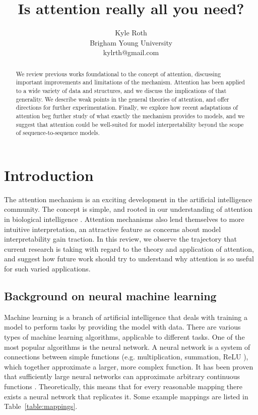 \documentclass{article}
\title{Is attention really all you need?}
\author{
Kyle Roth\\
\affiliations
Brigham Young University\\
\emails
kylrth@gmail.com
}
\begin{document}
\maketitle

\tableofcontents

\vspace{30px}

\begin{abstract}
We review previous works foundational to the concept of attention, discussing important improvements and limitations of the mechanism. Attention has been applied to a wide variety of data and structures, and we discuss the implications of that generality. We describe weak points in the general theories of attention, and offer directions for further experimentation. Finally, we explore how recent adaptations of attention beg further study of what exactly the mechanism provides to models, and we suggest that attention could be well-suited for model interpretability beyond the scope of sequence-to-sequence models.
\end{abstract}

\section{Introduction}

The attention mechanism is an exciting development in the artificial intelligence community. The concept is simple, and rooted in our understanding of attention in biological intelligence \cite{glimpses,neuroscience-inspired}. Attention mechanisms also lend themselves to more intuitive interpretation, an attractive feature as concerns about model interpretability gain traction. In this review, we observe the trajectory that current research is taking with regard to the theory and application of attention, and suggest how future work should try to understand why attention is so useful for such varied applications.

\subsection{Background on neural machine learning}\label{section:background}

Machine learning is a branch of artificial intelligence that deals with training a model to perform tasks by providing the model with data. There are various types of machine learning algorithms, applicable to different tasks. One of the most popular algorithms is the neural network. A neural network is a system of connections between simple functions (e.g. multiplication, summation, ReLU \cite{relu}), which together approximate a larger, more complex function. It has been proven that sufficiently large neural networks can approximate arbitrary continuous functions \cite{universal_approximators}. Theoretically, this means that for every reasonable mapping there exists a neural network that replicates it. Some example mappings are listed in Table~\ref{table:mappings}.
\end{document}
